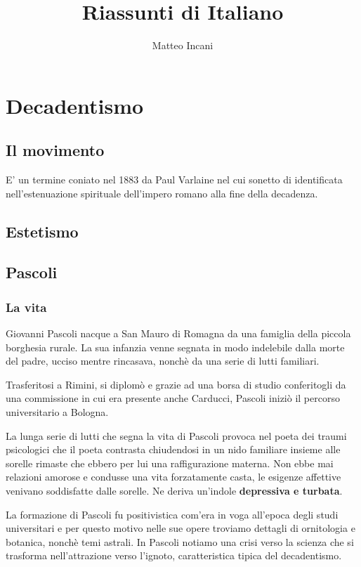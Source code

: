 \documentclass[12pt]{report}
\begin{document}
	
	\title{Riassunti di Italiano}
	\author{Matteo Incani}	
	\maketitle

	\chapter{Decadentismo}
		\section{Il movimento}
		
		E' un termine coniato nel 1883 da Paul Varlaine nel cui sonetto di identificata nell'estenuazione spirituale dell'impero romano alla fine della decadenza.
		
		\section{Estetismo}
		\section{Pascoli}
		\subsection{La vita}
	
		Giovanni Pascoli nacque a San Mauro di Romagna da una famiglia della piccola borghesia rurale. La sua infanzia venne segnata in modo indelebile dalla morte del padre, ucciso mentre rincasava, nonchè da una serie di lutti familiari.
		
		Trasferitosi a Rimini, si diplomò e grazie ad una borsa di studio conferitogli da una commissione in cui era presente anche Carducci, Pascoli iniziò il percorso universitario a Bologna.
		
		La lunga serie di lutti che segna la vita di Pascoli provoca nel poeta dei traumi psicologici che il poeta contrasta chiudendosi in un nido familiare insieme alle sorelle rimaste che ebbero per lui una raffigurazione materna.
		Non ebbe mai relazioni amorose e condusse una vita forzatamente casta, le esigenze affettive venivano soddisfatte dalle sorelle.
		Ne deriva un'indole \textbf{ depressiva e turbata}.
		
		La formazione di Pascoli fu positivistica com'era in voga all'epoca degli studi universitari e per questo motivo nelle sue opere troviamo dettagli di ornitologia e botanica, nonchè temi astrali.
		In Pascoli notiamo una crisi verso la scienza che si trasforma nell'attrazione verso l'ignoto, caratteristica tipica del decadentismo.
		
\end{document}
